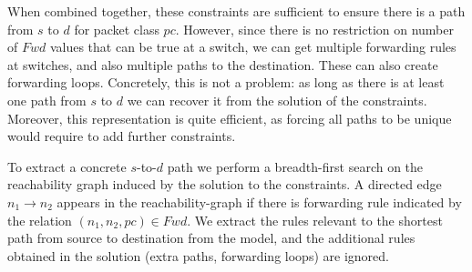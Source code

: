 When combined together, these constraints %
are sufficient to ensure there is a path from $s$ to $d$ for packet class $pc$.
However, since there is no restriction on number of $Fwd$ values that can be true at a switch, we can get multiple forwarding rules at switches, and 
also multiple paths to the destination. 
These can also create forwarding loops. 
Concretely, this is not a problem: as long as there is  at least one path from $s$ to $d$ we can recover it from the solution of the constraints. 
Moreover, this representation is quite efficient, as forcing all paths to be unique would
require to add further constraints.

To extract a concrete $s$-to-$d$ path we 
perform a breadth-first search on the reachability graph induced by the solution to the constraints. 
A directed edge $n_1 \rightarrow n_2$ appears in the reachability-graph if there is forwarding rule indicated by the relation $(n_1,n_2, pc) \in Fwd$. 
We extract the rules relevant to the shortest path from source to destination from the model, and the additional rules obtained in the solution (extra paths, forwarding loops) are ignored.  

